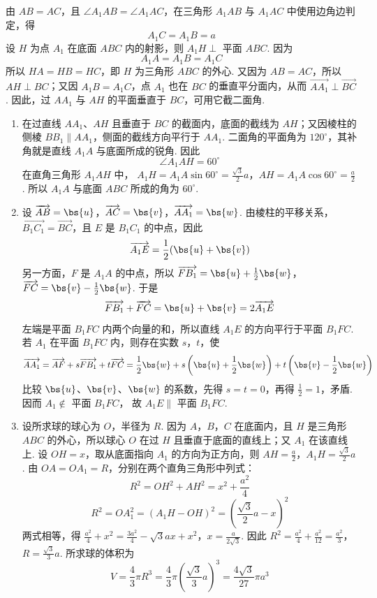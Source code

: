\begin{solution}
由 \(AB=AC\)，且 \(\angle A_1AB=\angle A_1AC\)，在三角形 \(A_1AB\) 与 \(A_1AC\) 中使用边角边判定，得
\[
A_1C=A_1B=a
\]
设 \(H\) 为点 \(A_1\) 在底面 \(ABC\) 内的射影，则 \(A_1H\perp\) 平面 \(ABC\). 因为
\[
A_1A=A_1B=A_1C
\]
所以 \(HA=HB=HC\)，即 \(H\) 为三角形 \(ABC\) 的外心.
又因为 \(AB=AC\)，所以 \(AH\perp BC\)；又因 \(A_1B=A_1C\)，点 \(A_1\) 也在 \(BC\) 的垂直平分面内，从而 \(\overrightarrow{AA_1}\perp\overrightarrow{BC}\). 因此，过 \(AA_1\) 与 \(AH\) 的平面垂直于 \(BC\)，可用它截二面角.

\begin{enumerate}
\item 在过直线 \(AA_1\)、\(AH\) 且垂直于 \(BC\) 的截面内，底面的截线为 \(AH\)；又因棱柱的侧棱 \(BB_1\parallel AA_1\)，侧面的截线方向平行于 \(AA_1\). 二面角的平面角为 \(120^{\circ}\)，其补角就是直线 \(A_1A\) 与底面所成的锐角. 因此
\[
\angle A_1AH=60^{\circ}
\]
在直角三角形 \(A_1AH\) 中，
\(A_1H=A_1A\sin60^{\circ}=\frac{\sqrt{3}}{2}a\)，\(AH=A_1A\cos60^{\circ}=\frac{a}{2}\).
所以 \(A_1A\) 与底面 \(ABC\) 所成的角为 \(60^{\circ}\).

\item 设
\(\overrightarrow{AB}=\bs{u}\)，\(\overrightarrow{AC}=\bs{v}\)，\(\overrightarrow{AA_1}=\bs{w}\).
由棱柱的平移关系，\(\overrightarrow{B_1C_1}=\overrightarrow{BC}\)，且 \(E\) 是 \(B_1C_1\) 的中点，因此
\[
\overrightarrow{A_1E}=\frac12(\bs{u}+\bs{v})
\]
另一方面，\(F\) 是 \(A_1A\) 的中点，所以
\(\overrightarrow{FB_1}=\bs{u}+\frac12\bs{w}\)，\(\overrightarrow{FC}=\bs{v}-\frac12\bs{w}\).
于是
\[
\overrightarrow{FB_1}+\overrightarrow{FC}=\bs{u}+\bs{v}
=2\overrightarrow{A_1E}
\]
左端是平面 \(B_1FC\) 内两个向量的和，所以直线 \(A_1E\) 的方向平行于平面 \(B_1FC\). 若 \(A_1\) 在平面 \(B_1FC\) 内，则存在实数 \(s\)，\(t\)，使
\[
\overrightarrow{AA_1}
=\overrightarrow{AF}+s\overrightarrow{FB_1}+t\overrightarrow{FC}
=\frac12\bs{w}+s\left(\bs{u}+\frac12\bs{w}\right)
+t\left(\bs{v}-\frac12\bs{w}\right)
\]
比较 \(\bs{u}\)、\(\bs{v}\)、\(\bs{w}\) 的系数，先得 \(s=t=0\)，再得 \(\frac12=1\)，矛盾. 因而 \(A_1\notin\) 平面 \(B_1FC\)，
故 \(A_1E\parallel\) 平面 \(B_1FC\).

\item 设所求球的球心为 \(O\)，半径为 \(R\). 因为 \(A\)，\(B\)，\(C\) 在底面内，且 \(H\) 是三角形 \(ABC\) 的外心，所以球心 \(O\) 在过 \(H\) 且垂直于底面的直线上；又 \(A_1\) 在该直线上. 设 \(OH=x\)，取从底面指向 \(A_1\) 的方向为正方向，则
\(AH=\frac{a}{2}\)，\(A_1H=\frac{\sqrt{3}}{2}a\).
由 \(OA=OA_1=R\)，分别在两个直角三角形中列式：
\[
R^2=OH^2+AH^2=x^2+\frac{a^2}{4}
\]
\[
R^2=OA_1^2=\left(A_1H-OH\right)^2
=\left(\frac{\sqrt{3}}{2}a-x\right)^2
\]
两式相等，得
\(\frac{a^2}{4}+x^2 =\frac{3a^2}{4}-\sqrt{3}ax+x^2\)，\(x=\frac{a}{2\sqrt{3}}\).
因此
\(R^2=\frac{a^2}{4}+\frac{a^2}{12}=\frac{a^2}{3}\)，\(R=\frac{\sqrt{3}}{3}a\).
所求球的体积为
\[
V=\frac43\pi R^3
=\frac43\pi\left(\frac{\sqrt{3}}{3}a\right)^3
=\frac{4\sqrt{3}}{27}\pi a^3
\]
\end{enumerate}
\end{solution}

